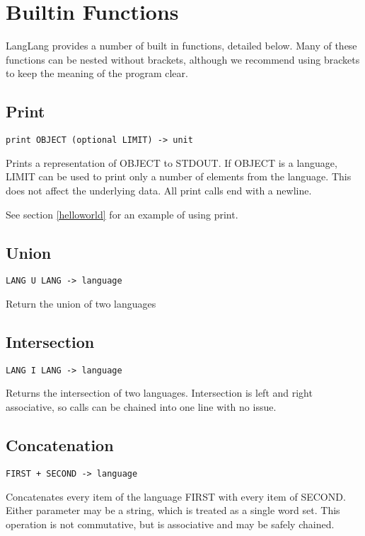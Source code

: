 \section{Builtin Functions}
\label{builtins}
\begin{normalsize}
LangLang provides a number of built in functions, detailed below. Many of these functions can be nested without brackets, although we recommend using brackets to keep the meaning of the program clear.
\end{normalsize}

\subsection{Print}
\label{print}
\begin{verbatim}
print OBJECT (optional LIMIT) -> unit
\end{verbatim}
\begin{normalsize}
Prints a representation of OBJECT to STDOUT. If OBJECT is a language, LIMIT can be used to print only a number of elements from the language. This does not affect the underlying data. All print calls end with a newline.

See section \ref{helloworld} for an example of using print.
\end{normalsize}

\subsection{Union}
\begin{verbatim}
LANG U LANG -> language
\end{verbatim}
\begin{normalsize}
Return the union of two languages
\end{normalsize}

\subsection{Intersection}
\begin{verbatim}
LANG I LANG -> language
\end{verbatim}
\begin{normalsize}
Returns the intersection of two languages. Intersection is left and right associative, so calls can be chained into one line with no issue.
\end{normalsize}

\subsection{Concatenation}
\begin{verbatim}
FIRST + SECOND -> language
\end{verbatim}
\begin{normalsize}
Concatenates every item of the language FIRST with every item of SECOND. Either parameter may be a string, which is treated as a single word set. This operation is not commutative, but is associative and may be safely chained.
\end{normalsize}

